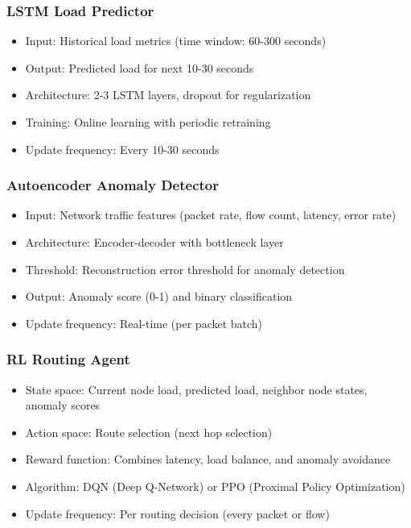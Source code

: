 \documentclass[11pt,a4paper]{article}
\begin{document}
\subsubsection{LSTM Load Predictor}
\begin{itemize}
    \item Input: Historical load metrics (time window: 60-300 seconds)
    \item Output: Predicted load for next 10-30 seconds
    \item Architecture: 2-3 LSTM layers, dropout for regularization
    \item Training: Online learning with periodic retraining
    \item Update frequency: Every 10-30 seconds
\end{itemize}

\subsubsection{Autoencoder Anomaly Detector}
\begin{itemize}
    \item Input: Network traffic features (packet rate, flow count, latency, error rate)
    \item Architecture: Encoder-decoder with bottleneck layer
    \item Threshold: Reconstruction error threshold for anomaly detection
    \item Output: Anomaly score (0-1) and binary classification
    \item Update frequency: Real-time (per packet batch)
\end{itemize}

\subsubsection{RL Routing Agent}
\begin{itemize}
    \item State space: Current node load, predicted load, neighbor node states, anomaly scores
    \item Action space: Route selection (next hop selection)
    \item Reward function: Combines latency, load balance, and anomaly avoidance
    \item Algorithm: DQN (Deep Q-Network) or PPO (Proximal Policy Optimization)
    \item Update frequency: Per routing decision (every packet or flow)
\end{itemize}
\end{document}
